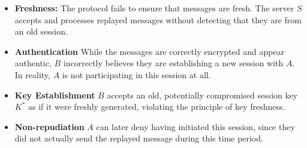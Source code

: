 \documentclass[11pt]{article}
\begin{document}
    \begin{itemize}
        \item \textbf{Freshness:} The protocol fails to ensure that messages are fresh. The server $S$ accepts and processes replayed messages without detecting that they are from an old session.

        \item \textbf{Authentication} While the messages are correctly encrypted and appear authentic, $B$ incorrectly believes they are establishing a new session with $A$. In reality, $A$ is not participating in this session at all.

        \item \textbf{Key Establishment} $B$ accepts an old, potentially compromised session key $K^*$ as if it were freshly generated, violating the principle of key freshness.

        \item \textbf{Non-repudiation} $A$ can later deny having initiated this session, since they did not actually send the replayed message during this time period.
    \end{itemize}
\end{document}
